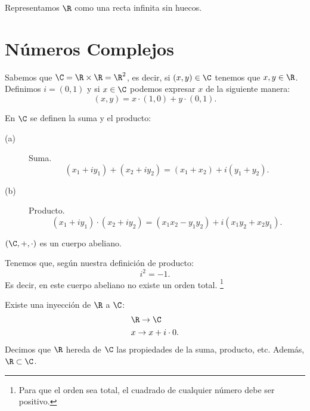 \begin{observation}
\normalfont Representamos $\displaystyle \R $ como una recta infinita sin huecos.
\end{observation}

\section{Números Complejos}

Sabemos que $\displaystyle \C = \R \times \R = \R^{2} $, es decir, si $\displaystyle \left(x,y\right)\in \C $ tenemos que $\displaystyle x, y \in \R $. Definimos $\displaystyle i = \left(0,1\right) $ y si $\displaystyle x \in \C $ podemos expresar $\displaystyle x $ de la siguiente manera:
\[\left(x,y\right) = x \cdot \left(1,0\right) + y \cdot \left(0,1\right) .\]

\begin{fdefinition}[]
\normalfont En $\displaystyle \C $ se definen la suma y el producto:
\begin{description}
\item[(a)] Suma.
	\[\left(x_{1} + iy_{1}\right) + \left(x_{2} + i y _{2}\right) = \left(x_{1} + x_{2}\right) + i \left(y_{1} + y_{2}\right) .\]
\item[(b)] Producto. 
	\[\left(x_{1} + i y_{1}\right) \cdot \left(x_{2} + i y_{2}\right) = \left(x_{1}x_{2}-y_{1}y_{2}\right) + i \left(x_{1}y_{2} + x_{2}y_{1}\right) .\]
\end{description}
\end{fdefinition}

\begin{ftheorem}[]
\normalfont $\displaystyle \left(\C, +, \cdot\right) $ es un cuerpo abeliano.
\end{ftheorem}

\begin{observation}
\normalfont Tenemos que, según nuestra definición de producto:
\[i^{2} = -1 .\]
Es decir, en este cuerpo abeliano no existe un orden total. \footnote{Para que el orden sea total, el cuadrado de cualquier número debe ser positivo.} 
\end{observation}
\begin{observation}
\normalfont Existe una inyección de $\displaystyle \R $ a $\displaystyle \C $:
\[
\begin{split}
& \R \to \C \\
& x \to x + i \cdot 0.
\end{split}
\]
Decimos que $\displaystyle \R $ hereda de $\displaystyle \C $ las propiedades de la suma, producto, etc. Además, $\displaystyle \R \subset \C $.
\end{observation}

